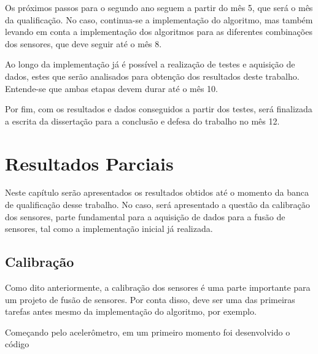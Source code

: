\documentclass[acronym, symbols, table]{fei}
\begin{document}
		Os próximos passos para o segundo ano seguem a partir do mês 5, que será o mês da qualificação. No caso, continua-se a implementação do algoritmo, mas também levando em conta a implementação dos algoritmos para as diferentes combinações dos sensores, que deve seguir até o mês 8.
		
		Ao longo da implementação já é possível a realização de testes e aquisição de dados, estes que serão analisados para obtenção dos resultados deste trabalho. Entende-se que ambas etapas devem durar até o mês 10.
		
		Por fim, com os resultados e dados conseguidos a partir dos testes, será finalizada a escrita da dissertação para a conclusão e defesa do trabalho no mês 12.
		
	\chapter{Resultados Parciais}\label{sec:resultados_parciais}
		Neste capítulo serão apresentados os resultados obtidos até o momento da banca de qualificação desse trabalho. No caso, será apresentado a questão da calibração dos sensores, parte fundamental para a aquisição de dados para a fusão de sensores, tal como a implementação inicial já realizada.
		
		\section{Calibração}
			Como dito anteriormente, a calibração dos sensores é uma parte importante para um projeto de fusão de sensores. Por conta disso, deve ser uma das primeiras tarefas antes mesmo da implementação do algoritmo, por exemplo.
			
			Começando pelo acelerômetro, em um primeiro momento foi desenvolvido o código 
	
	\printbibliography
\end{document}
